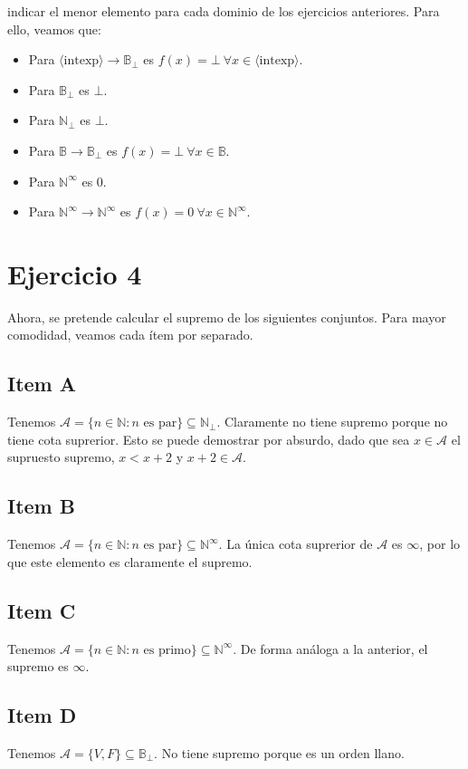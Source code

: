 \documentclass{article}
\newcommand{\aexp}[1]{\langle\text{#1}\rangle}
\newcommand{\intexp}{\aexp{intexp}}
\newcommand{\N}{\mathbb{N}}
\newcommand{\B}{\mathbb{B}}
\begin{document}
 indicar el menor elemento para cada dominio de los ejercicios anteriores.
Para ello, veamos que:
\begin{itemize}
	\item Para $\intexp \to \B_\bot$ es $f(x) = \bot\ \forall x \in \intexp$.
	\item Para $\B_\bot$ es $\bot$.
	\item Para $\N_\bot$ es $\bot$.
	\item Para $\B \to \B_\bot$ es $f(x) = \bot\ \forall x \in \B$.
	\item Para $\N^\infty$ es $0$.
	\item Para $\N^\infty \to \N^\infty$ es $f(x) = 0\ \forall x \in \N^\infty$.
\end{itemize}

\section*{Ejercicio 4}
Ahora, se pretende calcular el supremo de los siguientes conjuntos.
Para mayor comodidad, veamos cada ítem por separado.

\subsection*{Item A}
Tenemos $\mathcal{A} = \{n \in \N : n \text{ es par}\} \subseteq \N_\bot$.
Claramente no tiene supremo porque no tiene cota suprerior.
Esto se puede demostrar por absurdo, dado que sea $x \in \mathcal{A}$ el supruesto supremo, $x < x+2$ y $x+2 \in \mathcal{A}$.

\subsection*{Item B}
Tenemos $\mathcal{A} = \{n \in \N : n \text{ es par}\} \subseteq \N^\infty$.
La única cota suprerior de $\mathcal{A}$ es $\infty$, por lo que este elemento es claramente el supremo.

\subsection*{Item C}
Tenemos $\mathcal{A} = \{n \in \N : n \text{ es primo}\} \subseteq \N^\infty$.
De forma análoga a la anterior, el supremo es $\infty$.

\subsection*{Item D}
Tenemos $\mathcal{A} = \{V, F\} \subseteq \B_\bot$.
No tiene supremo porque es un orden llano.
\end{document}
